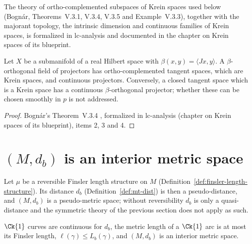 The theory of ortho-complemented subspaces of Krein spaces used below (Bognár, Theorems~V.3.1,
V.3.4, V.3.5 and Example~V.3.3), together with the majorant topology, the intrinsic dimension and
continuous families of Krein spaces, is formalized in lc-analysis and documented in the chapter on
Krein spaces of its blueprint.

\begin{corollary}
  \label{cor:mt-krein-projector-field}
  \leanok
  Let $X$ be a submanifold of a real Hilbert space with $\beta(x, y) = \langle Jx, y\rangle$. A
  $\beta$-orthogonal field of projectors has ortho-complemented tangent spaces, which are Krein
  spaces, and continuous projectors. Conversely, a closed tangent space which is a Krein space has a continuous
  $\beta$-orthogonal projector; whether these can be chosen smoothly in $p$ is not addressed.
\end{corollary}

\begin{proof}
  \leanok
  Bognár's Theorem~V.3.4 \cite[Theorem~V.3.4]{Bog74}, formalized in lc-analysis (chapter on Krein spaces of its blueprint), items 2, 3 and 4.
\end{proof}

\section{\texorpdfstring{$(M, d_b)$}{(M, d)} is an interior metric space}
\label{sec:ms-finsler-interior}

Let $\mu$ be a reversible Finsler length structure on $M$ (Definition~\ref{def:finsler-length-structure}).
Its distance $d_b$ (Definition~\ref{def:mt-dist}) is then a pseudo-distance, and $(M, d_b)$ is a
pseudo-metric space; without reversibility $d_b$ is only a quasi-distance and the symmetric
theory of the previous section does not apply as such.

\begin{theorem}
  \label{thm:ms-finsler-interior}
  \leanok
  $\Ck{1}$ curves are continuous for $d_b$, the metric length of a $\Ck{1}$ arc is at most its
  Finsler length, $\ell(\gamma) \leq L_b(\gamma)$, and $(M, d_b)$ is an interior metric space.
\end{theorem}

